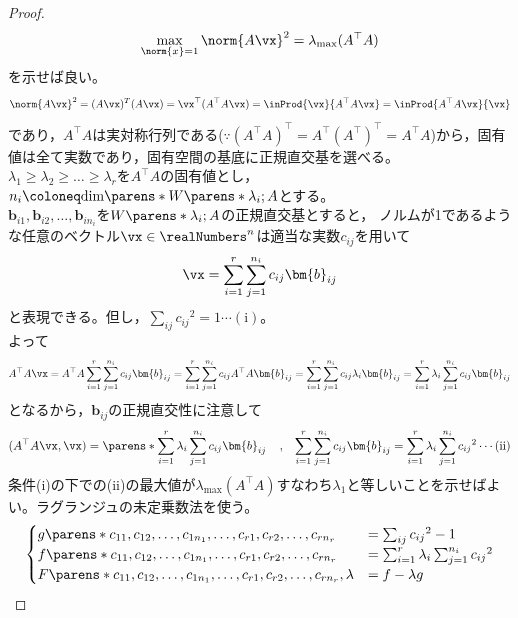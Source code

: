             \begin{proof}
                \[\max_{\norm{x}=1} {\norm{A\vx}}^2 = \lambda_{\mathrm{max}}(A^\top A)\]
                を示せば良い。\\
                \[{\norm{A\vx}}^2 = (A\vx)^T(A\vx) = {\vx}^\top (A^\top A\vx) = \inProd{\vx}{A^\top A\vx} = \inProd{A^\top A\vx}{\vx}\]
                であり，$A^\top A$は実対称行列である($\because (A^\top A)^\top = A^\top(A^\top)^\top = A^\top A$)から，固有値は全て実数であり，固有空間の基底に正規直交基を選べる。\\
                $\lambda_1 \geq \lambda_2 \geq \dots \geq \lambda_r$を$A^\top A$の固有値とし，$n_i \coloneq \text{dim}\parens*{W\parens*{\lambda_i;A}}$とする。\\
                $\bm{b}_{i1},\bm{b}_{i2},\dots,\bm{b}_{{in}_i}$を$W\parens*{\lambda_i;A}$の正規直交基とすると，
                ノルムが1であるような任意のベクトル$\vx \in \realNumbers^n$は適当な実数$c_{ij}$を用いて
                \[\vx = \sum_{i=1}^r{\sum_{j=1}^{n_i}{c_{ij}\bm{b}_{ij}}}\]
                と表現できる。但し，$\displaystyle \sum_{ij}{{c_{ij}}^2} = 1 \cdots(\text{i})$。\\
                よって
                \[A^\top A\vx = A^\top A\sum_{i=1}^r{\sum_{j=1}^{n_i}{c_{ij}\bm{b}_{ij}}} = \sum_{i=1}^r{\sum_{j=1}^{n_i}{c_{ij}A^\top A\bm{b}_{ij}}} = \sum_{i=1}^r{\sum_{j=1}^{n_i}{c_{ij}\lambda_i\bm{b}_{ij}}} = \sum_{i=1}^r{\lambda_i\sum_{j=1}^{n_i}{c_{ij}\bm{b}_{ij}}}\]
                となるから，$\bm{b}_{ij}$の正規直交性に注意して
                \[(A^\top A\vx,\vx) = \parens*{\sum_{i=1}^r{\lambda_i\sum_{j=1}^{n_i}{c_{ij}\bm{b}_{ij}}}\;\;\;\;,\;\;\; \sum_{i=1}^r{\sum_{j=1}^{n_i}{c_{ij}\bm{b}_{ij}}}} = \sum_{i=1}^r{\lambda_i\sum_{j=1}^{n_i}{{c_{ij}}^2}}\cdots(\text{ii})\]
                条件(i)の下での(ii)の最大値が$\lambda_{\mathrm{max}}(A^\top A)$すなわち$\lambda_1$と等しいことを示せばよい。ラグランジュの未定乗数法を使う。
                \begin{equation*}
                    \begin{cases}
                        g\parens*{c_{11},c_{12},\dots,c_{1n_1},\dots,c_{r1},c_{r2},\dots,c_{rn_r}} &= \sum_{ij}{{c_{ij}}^2} - 1 \\
                        f\parens*{c_{11},c_{12},\dots,c_{1n_1},\dots,c_{r1},c_{r2},\dots,c_{rn_r}} &= \sum_{i=1}^r{\lambda_i\sum_{j=1}^{n_i}{{c_{ij}}^2}} \\
                        F\parens*{c_{11},c_{12},\dots,c_{1n_1},\dots,c_{r1},c_{r2},\dots,c_{rn_r},\lambda} &= f-\lambda g

\end{cases}
\end{equation*}
\end{proof}
